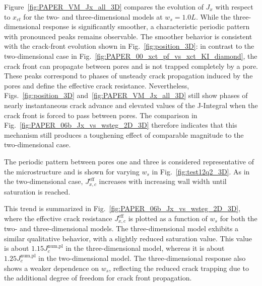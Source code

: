 \documentclass[pdflatex,sn-mathphys-num]{sn-jnl}%
\theoremstyle{thmstyleone}%
\theoremstyle{thmstyletwo}%
\theoremstyle{thmstylethree}%
\begin{document}
Figure~\ref{fig:PAPER_VM_Jx_all_3D} compares the evolution of $J_x$ with respect to $x_{ct}$ for the two- and three-dimensional models at $w_s=1.0L$. While the three-dimensional response is significantly smoother, a characteristic periodic pattern with pronounced peaks remains observable. The smoother behavior is consistent with the crack-front evolution shown in Fig.~\ref{fig:position_3D}: in contrast to the two-dimensional case in Fig.~\ref{fig:PAPER_00_xct_pf_vs_xct_KI_diamond}, the crack front can propagate between pores and is not trapped completely by a pore. These peaks correspond to phases of unsteady crack propagation induced by the pores and define the effective crack resistance. Nevertheless, Figs.~\ref{fig:position_3D} and~\ref{fig:PAPER_VM_Jx_all_3D} still show phases of nearly instantaneous crack advance and elevated values of the J-Integral when the crack front is forced to pass between pores. The comparison in Fig.~\ref{fig:PAPER_06b_Jx_vs_wsteg_2D_3D} therefore indicates that this mechanism still produces a toughening effect of comparable magnitude to the two-dimensional case.

The periodic pattern between pores one and three
 is considered representative of the microstructure and is shown for varying $w_s$ in Fig.~\ref{fig:test12q2_3D}. As in the two-dimensional case, $J_{x,c}^{\text{eff}}$ increases with increasing wall width until saturation is reached.

This trend is summarized in Fig.~\ref{fig:PAPER_06b_Jx_vs_wsteg_2D_3D}, where the effective crack resistance $J_{x,c}^{\text{eff}}$ is plotted as a function of $w_s$ for both the two- and three-dimensional models. The three-dimensional model exhibits a similar qualitative behavior, with a slightly reduced saturation value. This value is about $1.15J_c^{\text{num,pl}}$ in the three-dimensional model, whereas it is about $1.25J_c^{\text{num,pl}}$ in the two-dimensional model. The three-dimensional response also shows a weaker dependence on $w_s$, 
reflecting the reduced crack trapping due to the additional degree of freedom for crack front propagation.


\end{document}
